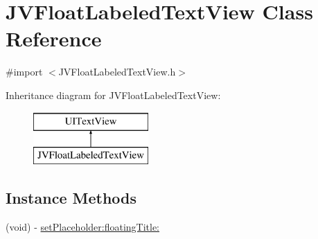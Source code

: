 \hypertarget{interface_j_v_float_labeled_text_view}{}\section{J\+V\+Float\+Labeled\+Text\+View Class Reference}
\label{interface_j_v_float_labeled_text_view}


{\ttfamily \#import $<$J\+V\+Float\+Labeled\+Text\+View.\+h$>$}

Inheritance diagram for J\+V\+Float\+Labeled\+Text\+View\+:\begin{figure}[H]
\begin{center}
\leavevmode
\includegraphics[height=2.000000cm]{interface_j_v_float_labeled_text_view}
\end{center}
\end{figure}
\subsection*{Instance Methods}
\begin{DoxyCompactItemize}
\item 
(void) -\/ \hyperlink{interface_j_v_float_labeled_text_view_ae22503f5ff0d75be684f75ea13ea250a}{set\+Placeholder\+:floating\+Title\+:}
\end{DoxyCompactItemize}

